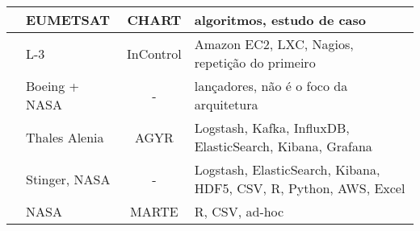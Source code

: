 \begin{table}[!ht]
\begin{center}
\begin{tabular}{|C{8em}|C{6em}|c|C{10em}|}
			\hline
			\cite{trollopeAnalysisAutomatedTechniques2018} & EUMETSAT & CHART & algoritmos, estudo de caso \\
			\hline
			\cite{gillesFlyingLargeConstellations2016} & L-3 & InControl & Amazon EC2, LXC, Nagios, repetição do primeiro \\
			\hline
			\cite{highsmithSpaceLaunchSystem2015} & Boeing + NASA & - & lançadores, não é o foco da arquitetura \\
			\hline
			\cite{hennionBigdataSatelliteYearly2018} & Thales Alenia & AGYR & Logstash, Kafka, InfluxDB, ElasticSearch, Kibana, Grafana \\
			\hline
			\cite{mateikUsingBigData2017} & Stinger, NASA & - & Logstash, ElasticSearch, Kibana, HDF5, CSV, R, Python, AWS, Excel \\
			\hline
			\cite{fernandezTelemetryAnomalyDetection2017} & NASA & MARTE & R, CSV, ad-hoc \\
			\hline
    \end{tabular}
    \end{center}
	\label{table:bigdataoperators}
\end{table}

